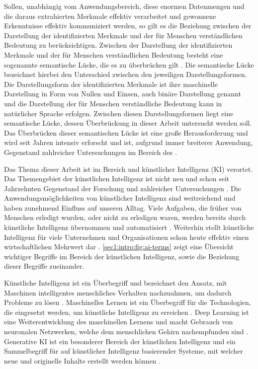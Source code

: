 Sollen, unabhängig vom Anwendungsbereich, diese enormen Datenmengen und die daraus extrahierten Merkmale effektiv verarbeitet und gewonnene Erkenntnisse effektiv kommuniziert werden, so gilt es die Beziehung zwischen der Darstellung der identifizierten Merkmale und der für Menschen verständlichen Bedeutung zu berücksichtigen.
Zwischen der Darstellung der identifizierten Merkmale und der für Menschen verständlichen Bedeutung besteht eine sogenannte semantische Lücke, die es zu überbrücken gilt \cite{bridging-semantic-gap}.
Die semantische Lücke bezeichnet hierbei den Unterschied zwischen den jeweiligen Darstellungsformen.
Die Darstellungsform der identifizierten Merkmale ist ihre maschinelle Darstellung in Form von Nullen und Einsen, auch binäre Darstellung genannt und die Darstellung der für Menschen verständliche Bedeutung kann in natürlicher Sprache erfolgen.
Zwischen diesen Darstellungsformen liegt eine semantische Lücke, dessen Überbrückung in dieser Arbeit untersucht werden soll.
Das Überbrücken dieser semantischen Lücke ist eine große Herausforderung und wird seit Jahren intensiv erforscht und ist, aufgrund immer breiterer Anwendung, Gegenstand zahlreicher Untersuchungen im Bereich des \mmiri{} \cite{bridging-semantic-gap}.

\clearpage

Das Thema dieser Arbeit ist im Bereich \mmir{} und künstlicher Intelligenz (KI) verortet.
Das Themengebiet der künstlichen Intelligenz ist nicht neu und schon seit Jahrzehnten Gegenstand der Forschung und zahlreicher Untersuchungen \cite{harvard-history-ai-research}.
Die Anwendungsmöglichkeiten von künstlicher Intelligenz sind weitreichend und haben zunehmend Einfluss auf unseren Alltag.
Viele Aufgaben, die früher von Menschen erledigt wurden, oder nicht zu erledigen waren, werden bereits durch künstliche Intelligenz übernommen und automatisiert \cite{ai-anwendungsbereiche}.
Weiterhin stellt künstliche Intelligenz für viele Unternehmen und Organisationen schon heute effektiv einen wirtschaftlichen Mehrwert dar \cite{ai-anwendungsbereiche}.
\cref{sec1:intro:fig:ai-terms} zeigt eine Übersicht wichtiger Begriffe im Bereich der künstlichen Intelligenz, sowie die Beziehung dieser Begriffe zueinander.
\par

\noindent
Künstliche Intelligenz ist ein Überbegriff und bezeichnet den Ansatz, mit Maschinen intelligentes menschliches Verhalten nachzuahmen, um dadurch Probleme zu lösen \cite{ai-ml-dl}.
Maschinelles Lernen ist ein Überbegriff für die Technologien, die eingesetzt werden, um künstliche Intelligenz zu erreichen \cite{ai-ml-dl}.
Deep Learning ist eine Weiterentwicklung des maschinellen Lernens und macht Gebrauch von neuronalen Netzwerken, welche dem menschlichen Gehirn nachempfunden sind \cite{ai-ml-dl}.
Generative KI ist ein besonderer Bereich der künstlichen Intelligenz und ein Sammelbegriff für auf künstlicher Intelligenz basierender Systeme, mit welcher neue und originelle Inhalte erstellt werden können \cite{gen-ai-definition}.

